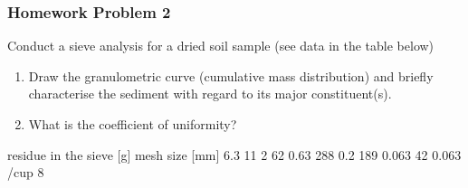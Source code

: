 \documentclass[letterpaper,10pt,english]{sphinxmanual}
\begin{document}
\subsubsection{Homework Problem 2}
\label{\detokenize{contents/tutorials/tutorial_02/tutorial_02:homework-problem-2}}
Conduct a sieve analysis for a dried soil sample (see data in the table below)
\begin{enumerate}
%
\item {} 
Draw the granulometric curve (cumulative mass distribution) and briefly characterise the sediment with regard to its major constituent(s).

\item {} 
What is the coefficient of uniformity?

\end{enumerate}

\begin{sphinxVerbatim}[commandchars=\\\{\}]
  \PYG{p}{[}   \PYG{p}{]}
  \PYG{p}{[}     \PYG{p}{]}
  \PYG{p}{[}     \PYG{p}{]}


     
 
\end{sphinxVerbatim}

\begin{sphinxVerbatim}[commandchars=\\\{\}]
                residue in the sieve [g] 
mesh size [mm]                           
6.3                                    11
2                                      62
0.63                                  288
0.2                                   189
0.063                                  42
\PYGZlt{} 0.063 /cup                            8
\end{sphinxVerbatim}
\end{document}
